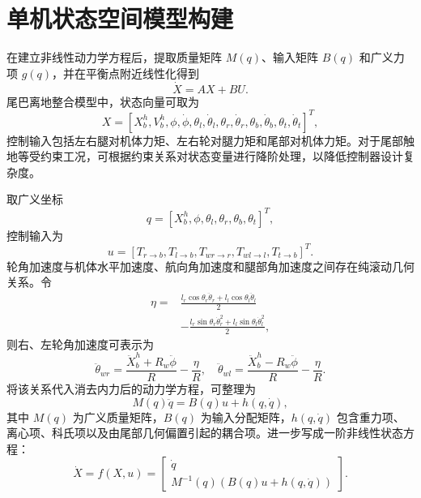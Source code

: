 \documentclass[type=bachelor]{bithesis}
\begin{document}
\section{单机状态空间模型构建}
在建立非线性动力学方程后，提取质量矩阵 $M(q)$、输入矩阵 $B(q)$ 和广义力项 $g(q)$，并在平衡点附近线性化得到
\begin{equation}
  \dot{X}=AX+BU .
\end{equation}
尾巴离地整合模型中，状态向量可取为
\begin{equation}
  X=[X_b^h,V_b^h,\phi,\dot{\phi},\theta_l,\dot{\theta}_l,\theta_r,\dot{\theta}_r,\theta_b,\dot{\theta}_b,\theta_t,\dot{\theta}_t]^T ,
\end{equation}
控制输入包括左右腿对机体力矩、左右轮对腿力矩和尾部对机体力矩。对于尾部触地等受约束工况，可根据约束关系对状态变量进行降阶处理，以降低控制器设计复杂度。

取广义坐标
\begin{equation}
  q=[X_b^h,\phi,\theta_l,\theta_r,\theta_b,\theta_t]^T ,
\end{equation}
控制输入为
\begin{equation}
  u=[T_{r\to b},T_{l\to b},T_{wr\to r},T_{wl\to l},T_{t\to b}]^T .
\end{equation}
轮角加速度与机体水平加速度、航向角加速度和腿部角加速度之间存在纯滚动几何关系。令
\begin{equation}
\begin{aligned}
  \eta
  =&\frac{l_r\cos\theta_r\ddot{\theta}_r+l_l\cos\theta_l\ddot{\theta}_l}{2}\\
  &-\frac{l_r\sin\theta_r\dot{\theta}_r^2+l_l\sin\theta_l\dot{\theta}_l^2}{2},
\end{aligned}
\end{equation}
则右、左轮角加速度可表示为
\begin{equation}
  \ddot{\theta}_{wr}=\frac{\ddot{X}_b^h+R_w\ddot{\phi}}{R}-\frac{\eta}{R},\quad
  \ddot{\theta}_{wl}=\frac{\ddot{X}_b^h-R_w\ddot{\phi}}{R}-\frac{\eta}{R}.
\end{equation}
将该关系代入消去内力后的动力学方程，可整理为
\begin{equation}
  M(q)\ddot{q}=B(q)u+h(q,\dot{q}),
\end{equation}
其中 $M(q)$ 为广义质量矩阵，$B(q)$ 为输入分配矩阵，$h(q,\dot{q})$ 包含重力项、离心项、科氏项以及由尾部几何偏置引起的耦合项。进一步写成一阶非线性状态方程：
\begin{equation}
  \dot{X}=f(X,u)=
  \begin{bmatrix}
    \dot{q}\\
    M^{-1}(q)(B(q)u+h(q,\dot{q}))
  \end{bmatrix}.
\end{equation}
\end{document}
